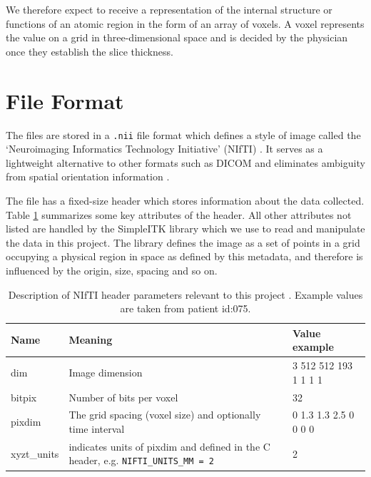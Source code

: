 \documentclass[11pt,twoside]{report}
\begin{document}
We therefore expect to receive a representation of the internal structure or functions of an atomic region in the form of an array of voxels. A voxel represents the value on a grid in three-dimensional space and is decided by the physician once they establish the slice thickness.

\section{File Format}\label{sec:data-file-format}

The files are stored in a \texttt{.nii} file format which defines a style of image called the `Neuroimaging Informatics Technology Initiative' (NIfTI) \cite{file-formats}. It serves as a lightweight alternative to other formats such as DICOM and eliminates ambiguity from spatial orientation information \cite{dicom-to-nifti-conversion}.

The file has a fixed-size header which stores information about the data collected. Table \ref{tab:nifti-header} summarizes some key attributes of the header. All other attributes not listed are handled by the SimpleITK library \cite{SimpleITK-paper} which we use to read and manipulate the data in this project. The library defines the image as a set of points in a grid occupying a physical region in space as defined by this metadata, and therefore is influenced by the origin, size, spacing and so on. 

\begin{table}[ht]
  \centering
  \begin{tabular}{>{\raggedright}p{1.5cm}p{8cm}p{4cm}}
      \toprule
      \textbf{Name} & \textbf{Meaning} & \textbf{Value example} \\
      \midrule
      dim & Image dimension & 3 512 512 193 1 1 1 1 \\
      bitpix & Number of bits per voxel & 32 \\
      pixdim & The grid spacing (voxel size) and optionally time interval & 0 1.3 1.3 2.5 0 0 0 0 \\
      xyzt\_units & indicates units of pixdim and defined in the C header, e.g. \texttt{NIFTI\_UNITS\_MM = 2} & 2 \\
      \bottomrule
  \end{tabular}
  \caption{Description of NIfTI header parameters relevant to this project \cite{dicom-to-nifti-conversion, nifti-headers, nifti-data-format}. Example values are taken from patient id:075.}
  \label{tab:nifti-header}
\end{table}
\end{document}
